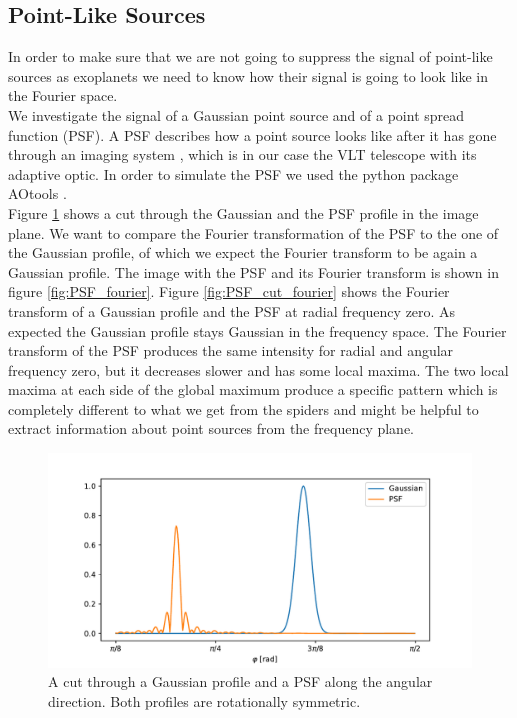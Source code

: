 \subsection{Point-Like Sources}
In order to make sure that we are not going to suppress the signal of point-like sources as exoplanets we need to know how their signal is going to look like in the Fourier space.\\
We investigate the signal of a Gaussian point source and of a point spread function (PSF). A PSF describes how a point source looks like after it has gone through an imaging system \cite{PSFwiki}, which is in our case the VLT telescope with its adaptive optic. In order to simulate the PSF we used the python package AOtools \cite{AOtools}.\\
Figure \ref{fig:PSF_cut_image} shows a cut through the Gaussian and the PSF profile in the image plane. We want to compare the Fourier transformation of the PSF to the one of the Gaussian profile, of which we expect the Fourier transform to be again a Gaussian profile. The image with the PSF and its Fourier transform is shown in figure \ref{fig:PSF_fourier}. Figure \ref{fig:PSF_cut_fourier} shows the Fourier transform of a Gaussian profile and the PSF at radial frequency zero. As expected the Gaussian profile stays Gaussian in the frequency space. The Fourier transform of the PSF produces the same intensity for radial and angular frequency zero, but it decreases slower and has some local maxima. The two local maxima at each side of the global maximum produce a specific pattern which is completely different to what we get from the spiders and might be helpful to extract information about point sources from the frequency plane.  
\begin{figure}[H]
	\centering
		\includegraphics[width=1.0\textwidth]{pics/PSF_cut_image.pdf}
		\caption{A cut through a Gaussian profile and a PSF along the angular direction. Both profiles are rotationally symmetric.}
		\label{fig:PSF_cut_image}
\end{figure}
